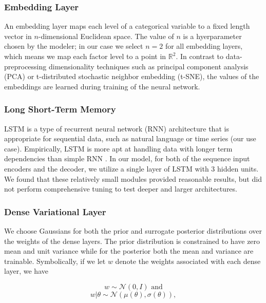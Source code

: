 \documentclass{article}
\begin{document}
\subsubsection{Embedding Layer}

An embedding layer maps each level of a categorical variable to a fixed length vector in $n$-dimensional Euclidean space. The value of $n$ is a hyerparameter chosen by the modeler; in our case we select $n = 2$ for all embedding layers, which means we map each factor level to a point in $\mathbb{R}^2$. In contrast to data-preprocessing dimensionality techniques such as principal component analysis (PCA) or t-distributed stochastic neighbor embedding (t-SNE), the values of the embeddings are learned during training of the neural network.

\subsubsection{Long Short-Term Memory}

LSTM is a type of recurrent neural network (RNN) architecture that is appropriate for sequential data, such as natural language or time series (our use case). Empirically, LSTM is more apt at handling data with longer term dependencies than simple RNN \cite{lecunDeepLearning2015}. In our model, for both of the sequence input encoders and the decoder, we utilize a single layer of LSTM with 3 hidden units. We found that these relatively small modules provided reasonable results, but did not perform comprehensive tuning to test deeper and larger architectures. 

\subsubsection{Dense Variational Layer}

We choose Gaussians for both the prior and surrogate posterior distributions over the weights of the dense layers. The prior distribution is constrained to have zero mean and unit variance while for the posterior both the mean and variance are trainable. Symbolically, if we let $w$ denote the weights associated with each dense layer, we have

\begin{equation}
    w \sim \mathcal{N}(0, I) \text{ and}
\end{equation}
\begin{equation}
    w|\theta \sim \mathcal{N}(\mu(\theta), \sigma(\theta)),
\end{equation}
\end{document}
